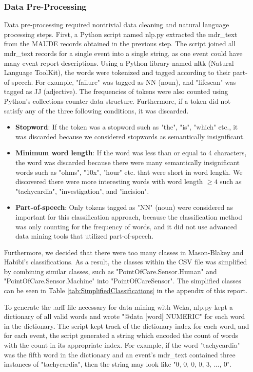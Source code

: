 \documentclass[11pt, notitlepage,abstracton,oneside]{article}   	%
\begin{document}
\subsubsection{Data Pre-Processing}
Data pre-processing required nontrivial data cleaning and natural language processing steps. First, a Python script named nlp.py extracted the mdr\_text from the MAUDE records obtained in the previous step. The script joined all mdr\_text records for a single event into a single string, as one event could have many event report descriptions. Using a Python library named nltk (Natural Language ToolKit), the words were tokenized and tagged according to their part-of-speech. For example, "failure" was tagged as NN (noun), and "lifescan" was tagged as JJ (adjective). The frequencies of tokens were also counted using Python's collections counter data structure. Furthermore, if a token did not satisfy any of the three following conditions, it was discarded.

\begin{itemize}
	\item \textbf{Stopword}: If the token was a stopword such as "the", "is", "which" etc., it was discarded because we considered stopwords as semantically insignificant.
	\item \textbf{Minimum word length}: If the word was less than or equal to 4 characters, the word was discarded because there were many semantically insignificant words such as "ohms", "10x", "hour" etc. that were short in word length. We discovered there were more interesting words with word length $\geq 4$ such as "tachycardia", "investigation", and "incision".
	\item \textbf{Part-of-speech}: Only tokens tagged as "NN" (noun) were considered as important for this classification approach, because the classification method was only counting for the frequency of words, and it did not use advanced data mining tools that utilized part-of-speech.
\end{itemize}

Furthermore, we decided that there were too many classes in Mason-Blakey and Habibi's classifications. As a result, the classes within the CSV file was simplified by combining similar classes, such as "PointOfCare.Sensor.Human" and "PointOfCare.Sensor.Machine" into "PointOfCareSensor". The simplified classes can be seen in Table \ref{tab:SimplifiedClassifications} in the appendix of this report.

To generate the .arff file necessary for data mining with Weka, nlp.py kept a dictionary of all valid words and wrote "@data [word] NUMERIC" for each word in the dictionary. The script kept track of the dictionary index for each word, and for each event, the script generated a string which encoded the count of words with the count in its appropriate index. For example, if the word "tachycardia" was the fifth word in the dictionary and an event's mdr\_text contained three instances of "tachycardia", then the string may look like "0, 0, 0, 0, 3, ..., 0".
\end{document}
